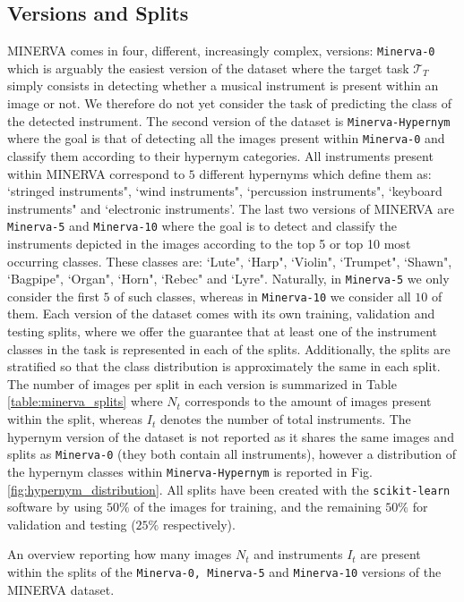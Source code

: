 \subsection{Versions and Splits}

MINERVA comes in four, different, increasingly complex, versions: \texttt{Minerva-0} which is arguably the easiest version of the dataset where the target task $\mathcal{T}_T$ simply consists in detecting whether a musical instrument is present within an image or not. We therefore do not yet consider the task of predicting the class of the detected instrument. The second version of the dataset is \texttt{Minerva-Hypernym} where the goal is that of detecting all the images present within \texttt{Minerva-0} and classify them according to their hypernym categories. All instruments present within MINERVA correspond to $5$ different hypernyms which define them as: `stringed instruments", `wind instruments", `percussion instruments", `keyboard instruments" and `electronic instruments'. The last two versions of MINERVA are \texttt{Minerva-5} and \texttt{Minerva-10} where the goal is to detect and classify the instruments depicted in the images according to the top 5 or top 10 most occurring classes. These classes are: `Lute", `Harp", `Violin", `Trumpet", `Shawn", `Bagpipe", `Organ", `Horn", `Rebec" and `Lyre". Naturally, in \texttt{Minerva-5} we only consider the first $5$ of such classes, whereas in \texttt{Minerva-10} we consider all $10$ of them. Each version of the dataset comes with its own training, validation and testing splits, where we offer the guarantee that at least one of the instrument classes in the task is represented in each of the splits. Additionally, the splits are stratified so that the class distribution is approximately the same in each split. The number of images per split in each version is summarized in Table \ref{table:minerva_splits} where $N_t$ corresponds to the amount of images present within the split, whereas $I_t$ denotes the number of total instruments. The hypernym version of the dataset is not reported as it shares the same images and splits as \texttt{Minerva-0} (they both contain all instruments), however a distribution of the hypernym classes within \texttt{Minerva-Hypernym} is reported in Fig. \ref{fig:hypernym_distribution}. All splits have been created with the \texttt{scikit-learn} software \cite{pedregosa2011scikit} by using $50\%$ of the images for training, and the remaining $50\%$ for validation and testing ($25\%$ respectively). 

\begin{table}

\caption{An overview reporting how many images $N_t$ and instruments $I_t$ are present within the splits of the \texttt{Minerva-0, Minerva-5} and \texttt{Minerva-10} versions of the MINERVA dataset.}
\label{table:minerva_splits}
\end{table}


